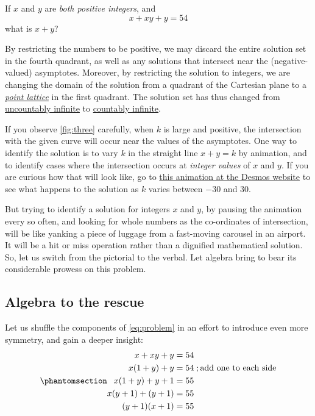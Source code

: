 \documentclass[
  a4paper,
]{article}
\begin{document}
If \(x\) and \(y\) are \emph{both positive integers}, and \[
x + xy + y = 54
\] what is \(x + y\)?

By restricting the numbers to be positive, we may discard the entire
solution set in the fourth quadrant, as well as any solutions that
intersect near the (negative-valued) asymptotes. Moreover, by
restricting the solution to integers, we are changing the domain of the
solution from a quadrant of the Cartesian plane to a
\href{https://mathworld.wolfram.com/PointLattice.html}{\emph{point
lattice}} in the first quadrant. The solution set has thus changed from
\href{https://mathworld.wolfram.com/UncountablyInfinite.html}{uncountably
infinite} to
\href{https://mathworld.wolfram.com/CountablyInfinite.html}{countably
infinite}.

If you observe \cref{fig:three} carefully, when \(k\) is large and
positive, the intersection with the given curve will occur near the
values of the asymptotes. One way to identify the solution is to vary
\(k\) in the straight line \(x + y = k\) by animation, and to identify
cases where the intersection occurs at \emph{integer values} of \(x\)
and \(y\). If you are curious how that will look like, go to
\href{https://www.desmos.com/calculator/1mklcrdbxw}{this animation at
the Desmos website} to see what happens to the solution as \(k\) varies
between \(-30\) and \(30\).

But trying to identify a solution for integers \(x\) and \(y\), by
pausing the animation every so often, and looking for whole numbers as
the co-ordinates of intersection, will be like yanking a piece of
luggage from a fast-moving carousel in an airport. It will be a hit or
miss operation rather than a dignified mathematical solution. So, let us
switch from the pictorial to the verbal. Let algebra bring to bear its
considerable prowess on this problem.

\subsection{Algebra to the rescue}\label{algebra-to-the-rescue}

Let us shuffle the components of \cref{eq:problem} in an effort to
introduce even more symmetry, and gain a deeper insight:
\begin{equation}\phantomsection\label{eq:three}{
\begin{aligned}
x + xy + y &= 54\\
x(1 + y) + y &= 54\; ; \mbox{add one to each side} \\
x(1 + y) + y + 1 &= 55\\
x(y + 1) + (y + 1) &= 55\\
(y + 1)(x + 1) &= 55\\
\end{aligned}
}\end{equation}
\end{document}
